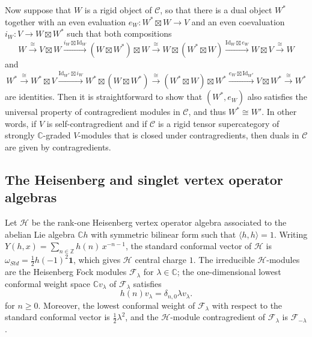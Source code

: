 \documentclass[11pt, reqno]{amsart}
\theoremstyle{definition}\newtheorem{defi}[thm]{Definition}
\theoremstyle{definition}\newtheorem{rem}[thm]{Remark}
\theoremstyle{definition}\newtheorem{exam}[thm]{Example}
\theoremstyle{definition}\newtheorem{assum}[thm]{Assumption}
\newcommand{\cH}{\mathcal{H}}
\newcommand{\cF}{\mathcal{F}}
\newcommand{\cC}{\mathcal{C}}
\newcommand{\CC}{\mathbb{C}}
\newcommand{\ZZ}{\mathbb{Z}}
\newcommand{\Id}{\mathrm{Id}}
\newcommand{\tens}{\boxtimes}
\newcommand{\vac}{\mathbf{1}}
\begin{document}
Now suppose that $W$ is a rigid object of $\cC$, so that there is a dual object $W^*$ together with an even evaluation $e_W: W^*\tens W\rightarrow V$ and an even coevaluation $i_W: V\rightarrow W\tens W^*$ such that both compositions
\begin{equation*}
W \xrightarrow{\cong} V\tens W\xrightarrow{i_W\tens\Id_W} (W\tens W^*)\tens W\xrightarrow{\cong} W\tens (W^*\tens W)\xrightarrow{\Id_W\tens e_W} W\tens V\xrightarrow{\cong} W
\end{equation*}
and
\begin{equation*}
W^* \xrightarrow{\cong} W^*\tens V\xrightarrow{\Id_{W^*}\tens i_W} W^*\tens (W\tens W^*)\xrightarrow{\cong} (W^*\tens W)\tens W^*\xrightarrow{e_W\tens\Id_{W^*}} V\tens W^*\xrightarrow{\cong} W^*
\end{equation*}
are identities. Then it is straightforward to show that $(W^*, e_W)$ also satisfies the universal property of contragredient modules in $\cC$, and thus $W^*\cong W'$. In other words, if $V$ is self-contragredient and if $\cC$ is a rigid tensor supercategory of strongly $\CC$-graded $V$-modules that is closed under contragredients, then duals in $\cC$ are given by contragredients.



\subsection{The Heisenberg and singlet vertex operator algebras}



Let $\cH$ be the rank-one Heisenberg vertex operator algebra associated to the  abelian Lie algebra $\CC h$ with symmetric bilinear form such that $\langle h,h\rangle =1$. Writing $Y(h,x)=\sum_{n\in\ZZ} h(n)\,x^{-n-1}$, the standard conformal vector of $\cH$ is $\omega_{Std}=\frac{1}{2} h(-1)^2\vac$, which gives $\cH$ central charge $1$. The irreducible $\cH$-modules are the Heisenberg Fock modules $\cF_\lambda$ for $\lambda\in\CC$; the one-dimensional lowest conformal weight space $\CC v_\lambda$ of $\cF_\lambda$ satisfies
\begin{equation*}
h(n)v_\lambda =\delta_{n,0}\lambda v_\lambda.
\end{equation*}
for $n\geq 0$. Moreover, the lowest conformal weight of $\cF_\lambda$ with respect to the standard conformal vector is $\frac{1}{2}\lambda^2$, and the $\cH$-module contragredient of $\cF_\lambda$ is $\cF_{-\lambda}$.
\end{document}
